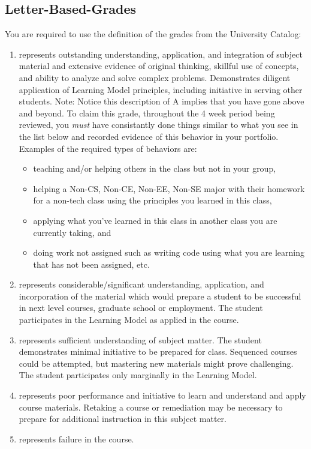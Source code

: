 \documentclass[12pt]{amsart}
\makeatletter
\newcommand{\skipitems}[1]{%
  \addtocounter{\@enumctr}{#1}%
}
\makeatother
\begin{document}
\subsection{Letter-Based-Grades}You are required to use the definition of the grades from the University Catalog:
\begin{enumerate}[label=\textbf{\Alph*}]
	\item represents outstanding understanding, application, and integration of subject material and extensive evidence of original thinking, skillful use of concepts, and ability to analyze and solve complex problems. Demonstrates diligent application of Learning Model principles, including initiative in serving other students.
	Note: Notice this description of A implies that you have gone above and beyond. To claim this grade, throughout the 4 week period being reviewed, you \textit{must} have consistantly done things similar to what you see in the list below  and recorded evidence of this behavior in your portfolio. 
Examples of the required types of behaviors are:
\begin{itemize}  
\item teaching and/or helping others in the class but not in your group,
\item helping a Non-CS, Non-CE, Non-EE, Non-SE major with their homework for a non-tech class using the principles you learned in this class,
\item applying what you've learned in this class in another class you are currently taking, and
\item doing work not assigned such as writing code using what you are learning that has not been assigned, etc.
\end{itemize}

	\item represents considerable/significant understanding, application, and incorporation of the material which would prepare a student to be successful in next level courses, graduate school or employment. The student participates in the Learning Model as applied in the course. 
	\item represents sufficient understanding of subject matter. The student demonstrates minimal initiative to be prepared for class. Sequenced courses could be attempted, but mastering new materials might prove challenging. The student participates only marginally in the Learning Model.
	\item represents poor performance and initiative to learn and understand and apply course materials. Retaking a course or remediation may be necessary to prepare for additional instruction in this subject matter. 
	\skipitems{1}
	\item represents failure in the course.
\end{enumerate}
\end{document}

